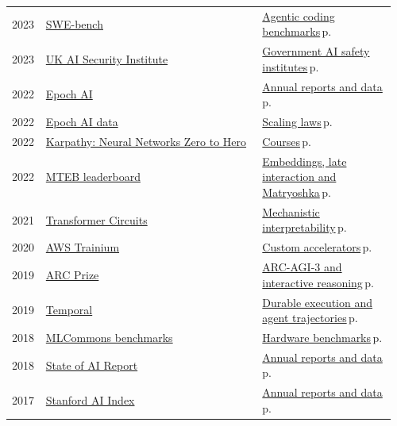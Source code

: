 \documentclass[10pt,a4paper,openany]{report}
\begin{document}
{\begin{longtable}{@{}p{0.07\linewidth}>{\raggedright}p{0.55\linewidth}>{\raggedright\arraybackslash}p{0.34\linewidth}@{}}
2023 & \href{https://www.swebench.com}{SWE-bench} & \hyperref[c:evals-3]{Agentic coding benchmarks}\,{\color{muted}\scriptsize p.\,\pageref{c:evals-3}}\\
2023 & \href{https://www.aisi.gov.uk}{UK AI Security Institute} & \hyperref[c:safety-13]{Government AI safety institutes}\,{\color{muted}\scriptsize p.\,\pageref{c:safety-13}}\\
2022 & \href{https://epoch.ai}{Epoch AI} & \hyperref[c:learn-2]{Annual reports and data}\,{\color{muted}\scriptsize p.\,\pageref{c:learn-2}}\\
2022 & \href{https://epoch.ai/data}{Epoch AI data} & \hyperref[c:training-1]{Scaling laws}\,{\color{muted}\scriptsize p.\,\pageref{c:training-1}}\\
2022 & \href{https://karpathy.ai/zero-to-hero.html}{Karpathy: Neural Networks Zero to Hero} & \hyperref[c:learn-1]{Courses}\,{\color{muted}\scriptsize p.\,\pageref{c:learn-1}}\\
2022 & \href{https://huggingface.co/spaces/mteb/leaderboard}{MTEB leaderboard} & \hyperref[c:context-8]{Embeddings, late interaction and Matryoshka}\,{\color{muted}\scriptsize p.\,\pageref{c:context-8}}\\
2021 & \href{https://transformer-circuits.pub}{Transformer Circuits} & \hyperref[c:safety-6]{Mechanistic interpretability}\,{\color{muted}\scriptsize p.\,\pageref{c:safety-6}}\\
2020 & \href{https://aws.amazon.com/ai/machine-learning/trainium/}{AWS Trainium} & \hyperref[c:hardware-11]{Custom accelerators}\,{\color{muted}\scriptsize p.\,\pageref{c:hardware-11}}\\
2019 & \href{https://arcprize.org}{ARC Prize} & \hyperref[c:evals-4]{ARC-AGI-3 and interactive reasoning}\,{\color{muted}\scriptsize p.\,\pageref{c:evals-4}}\\
2019 & \href{https://temporal.io}{Temporal} & \hyperref[c:agents-13]{Durable execution and agent trajectories}\,{\color{muted}\scriptsize p.\,\pageref{c:agents-13}}\\
2018 & \href{https://mlcommons.org/benchmarks/}{MLCommons benchmarks} & \hyperref[c:hardware-16]{Hardware benchmarks}\,{\color{muted}\scriptsize p.\,\pageref{c:hardware-16}}\\
2018 & \href{https://www.stateof.ai}{State of AI Report} & \hyperref[c:learn-2]{Annual reports and data}\,{\color{muted}\scriptsize p.\,\pageref{c:learn-2}}\\
2017 & \href{https://hai.stanford.edu/ai-index}{Stanford AI Index} & \hyperref[c:learn-2]{Annual reports and data}\,{\color{muted}\scriptsize p.\,\pageref{c:learn-2}}\\

\end{longtable}}
\end{document}
